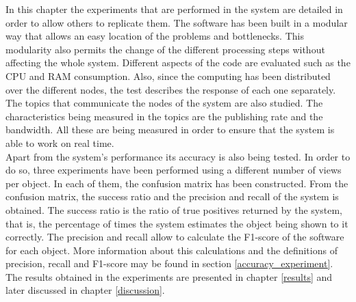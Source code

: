 
In this chapter the experiments that are performed in the system are detailed in order to allow others to replicate them. 
The software has been built in a modular way that allows an easy location of the problems and bottlenecks.
This modularity also permits the change of the different processing steps without affecting the whole system.  
Different aspects of the code are evaluated such as the CPU and RAM consumption. 
Also, since the computing has been distributed over the different nodes, the test describes the response of each one separately. 
The topics that communicate the nodes of the system are also studied. 
The characteristics being measured in the topics are the publishing rate and the bandwidth. 
All these are being measured in order to ensure that the system is able to work on real time. 
\\%

Apart from the system's performance its accuracy is also being tested. 
In order to do so, three experiments have been performed using a different number of views per object. 
In each of them, the confusion matrix has been constructed. 
From the confusion matrix, the success ratio and the precision and recall of the system is obtained. 
The success ratio is the ratio of true positives returned by the system, that is, the percentage of times the system estimates the object being shown to it correctly. 
The precision and recall allow to calculate the F1-score of the software for each object. 
More information about this calculations and the definitions of precision, recall and F1-score may be found in section \ref{accuracy_experiment}.
The results obtained in the experiments are presented in chapter \ref{results} and later discussed in chapter \ref{discussion}.
\\%


